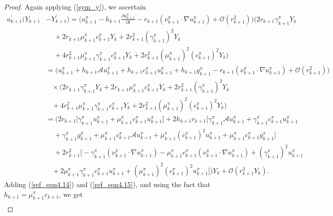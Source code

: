 \documentclass{article}
\theoremstyle{definition}
\numberwithin{equation}{section}
\begin{document}
\begin{proof}
Again applying (\ref{sym_y}), we ascertain
\begin{align}
u_{k+1}^{'}(Y_{k+1} &- Y_{k+1}^{'}) = \Big(u_{k+1}^{\pi} - h_{k+1}\frac{\partial u_{k+1}^{\pi}}{\partial t} - r_{k+1}(\nu_{k+1}^{\pi} \cdot\nabla u_{k+1}^{\pi}) + \mathcal{O}(r_{k+1}^{2})\Big) \Big( 2r_{k+1}\gamma_{k+1}^{\pi}Y_{k} \nonumber  \\  & 
\;\;\;\; + 2r_{k+1}\mu_{k+1}^{\pi}c^{\pi}_{k+1}Y_{k}  + 2r_{k+1}^{2}(\gamma_{k+1}^{\pi})^{2}Y_{k}  \nonumber  \\& \;\;\;\; + 4r_{k+1}^{2}\mu_{k+1}^{\pi}\gamma_{k+1}^{\pi} c_{k+1}^{\pi}Y_{k} + 2r_{k+1}^{2}(\mu_{k+1}^{\pi})^{2}(c_{k+1}^{\pi})^{2}Y_{k} \Big) \nonumber \\&  = 
\Big(u_{k+1}^{\pi} + h_{k+1} \mathcal{A}u_{k+1}^{\pi} + h_{k+1}c_{k+1}^{\pi}u_{k+1}^{\pi} + h_{k+1}g_{k+1}^{\pi} - r_{k+1}(\nu_{k+1}^{\pi} \cdot\nabla u_{k+1}^{\pi}) + \mathcal{O}(r_{k+1}^{2})\Big)
\nonumber \\  &   \;\;\; \times \Big( 2r_{k+1}\gamma_{k+1}^{\pi}Y_{k}  +2r_{k+1}\mu_{k+1}^{\pi}c_{k+1}^{\pi}Y_{k}   + 2r_{k+1}^{2}(\gamma_{k+1}^{\pi})^{2}Y_{k} \nonumber  \\& \;\;\; +  4r_{k+1}^{2}\mu_{k+1}^{\pi}\gamma_{k+1}^{\pi} c_{k+1}^{\pi}Y_{k} + 2r_{k+1}^{2}(\mu_{k+1}^{\pi})^{2}(c_{k+1}^{\pi})^{2}Y_{k} \Big) \nonumber \\
& = \Big( 2r_{k+1}\big[\gamma_{k+1}^{\pi}u_{k+1}^{\pi} + \mu^{\pi}_{k+1}c^{\pi}_{k+1}u^{\pi}_{k+1}\big] + 2 h_{k+1}r_{k+1}\big[\gamma_{k+1}^{\pi} \mathcal{A}u_{k+1}^{\pi} + \gamma_{k+1}^{\pi}c_{k+1}^{\pi}u_{k+1}^{\pi}  
\nonumber  \\ & \;\;\;\; + \gamma_{k+1}^{\pi}g_{k+1}^{\pi}   +\mu_{k+1}^{\pi}c_{k+1}^{\pi}\mathcal{A}u_{k+1}^{\pi}+\mu_{k+1}^{\pi}(c_{k+1}^{\pi})^{2}u_{k+1}^{\pi} 
+\mu_{k+1}^{\pi} c^{\pi}_{k+1} g_{k+1}^{\pi}\big] \nonumber 
\\  & \;\;\;\; 
+ 2r_{k+1}^{2}\big[ - \gamma_{k+1}^{\pi}(\nu_{k+1}^{\pi}\cdot \nabla  u_{k+1}^{\pi}) - \mu_{k+1}^{\pi}c_{k+1}^{\pi}(\nu_{k+1}^{\pi} \cdot \nabla u_{k+1}^{\pi}) +  (\gamma_{k+1}^{\pi})^{2}u_{k+1}^{\pi}  \nonumber  \\ & \;\;\;   + 2\mu_{k+1}^{\pi}\gamma_{k+1}^{\pi}c_{k+1}^{\pi} u_{k+1}^{\pi}  
 + (\mu_{k+1}^{\pi})^{2}(c_{k+1}^{\pi})^{2}u_{k+1}^{\pi}\big] \Big)Y_{k} + \mathcal{O}(r_{k+1}^{3}Y_{k}). \label{ref_eqn4.15}
\end{align}
Adding (\ref{ref_eqn4.14}) and (\ref{ref_eqn4.15}), and using the fact that $h_{k+1} = \mu_{k+1}^{\pi} r_{k+1}$, we get
\begin{align}

\end{align}
\end{proof}
\end{document}
